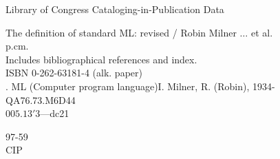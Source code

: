 \documentclass[12pt]{article}
\begin{document}
\noindent
Library of Congress Cataloging-in-Publication Data
\medskip
\begin{flushleft}
The definition of standard ML: revised / Robin Milner $\ldots$ et al.\\
\quad\quad p.\quad cm.\\
\quad Includes bibliographical references and index.\\
\quad ISBN 0-262-63181-4 (alk. paper)\\
. ML (Computer program language)\quad I. Milner, R. (Robin), 1934-\\
QA76.73.M6D44\\
$005.13'3$---dc21
\end{flushleft}
\begin{flushright}
97-59\\
CIP
\end{flushright}
\clearpage
\pagestyle{headings}
\thispagestyle{empty}
\setcounter{page}{5}
\renewcommand{\thepage}{\roman{page}}
\tableofcontents
\clearpage
\pagestyle{empty}
\ \clearpage
\pagestyle{myheadings}
\pagestyle{empty}

\clearpage
\pagestyle{empty}
\ \clearpage
\pagestyle{headings}
\setcounter{page}{1}
\renewcommand{\thepage}{\arabic{page}}
\thispagestyle{empty}

\thispagestyle{empty}

\thispagestyle{empty}

\thispagestyle{empty}

\thispagestyle{empty}

\thispagestyle{empty}

\thispagestyle{empty}

\thispagestyle{empty}

\appendix
\thispagestyle{empty}

\blankPage
\thispagestyle{empty}

\blankPage
\thispagestyle{empty}

\blankPage
\thispagestyle{empty}

\blankPage
\thispagestyle{empty}

\thispagestyle{empty}

\blankPage
\thispagestyle{empty}

\blankPage
{}
\thispagestyle{empty}

\clearpage
\blankPage
\thispagestyle{empty}

\end{document}
